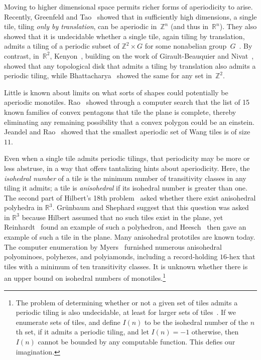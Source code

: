 Moving to higher dimensional space permits richer forms of aperiodicity to
arise.  Recently, Greenfeld and Tao~\cite{GT2} showed that in sufficiently 
high dimensions, a single tile, tiling \emph{only by translation}, can be
aperiodic in~$\mathbb{Z}^n$ (and thus in~$\mathbb{R}^n$).
They also showed that it is undecidable whether a single
tile, again tiling by translation, admits a tiling of a periodic
subset of $\mathbb{Z}^2 \times G$ for some nonabelian group~$G$~\cite{GT1}.
By contrast, in~$\mathbb{R}^2$,
Kenyon~\cite{Kenyon,Kenyonerratum,Kenyon2}, building on the work of
Girault-Beauquier and Nivat~\cite{GiraultBeauquierNivat}, showed that
any topological disk that admits a tiling by translation also admits a
periodic tiling, while Bhattacharya~\cite{Bhattacharya} showed the
same for any set in~$\mathbb{Z}^2$.

Little is known about limits on what sorts of shapes could potentially be
aperiodic monotiles.  Rao~\cite{Rao} showed through a computer
search that the list of 15 known families of convex pentagons that tile the
plane is complete, thereby eliminating any remaining possibility
that a convex polygon could be an einstein.
Jeandel and Rao~\cite{JeandelRao} showed that the smallest aperiodic set
of Wang tiles is of size~$11$.

Even when a single tile admits periodic tilings, that periodicity may be 
more or less abstruse, in a way that offers tantalizing hints about 
aperiodicity.  Here, the \emph{isohedral number} of a tile is the minimum
number of transitivity classes in any tiling it admits; a tile is
\emph{anisohedral} if its isohedral number is greater than one.
The second part of Hilbert's 18th problem~\cite{Hilbert} asked whether
there exist anisohedral polyhedra in $\mathbb{R}^3$. Gr\"unbaum and 
Shephard suggest
\cite[Section~9.6]{GS} that this question was asked in $\mathbb{R}^3$
because Hilbert assumed that no such tiles exist in the plane, yet
Reinhardt~\cite{Reinhardt} found an example of such a polyhedron, and
Heesch~\cite{Heesch} then gave an example of such a tile in the plane.
Many anisohedral prototiles are known today. The computer enumeration
by Myers~\cite{Myers} furnished numerous anisohedral polyominoes, 
polyhexes, and polyiamonds, including a record-holding $16$-hex that
tiles with a minimum of ten transitivity classes.  It is unknown whether
there is an upper bound on isohedral numbers of monotiles.\footnote{The problem of  determining whether or not a given set of tiles admits a periodic tiling is also undecidable, at least for larger sets of tiles~\cite{Gurevich}. If we enumerate sets of tiles, and define $I(n)$ to be the isohedral number of the $n$th set, if it admits a periodic tiling, and let $I(n) = -1$ otherwise, then $I(n)$ cannot be bounded by any computable function. This defies our imagination.}

